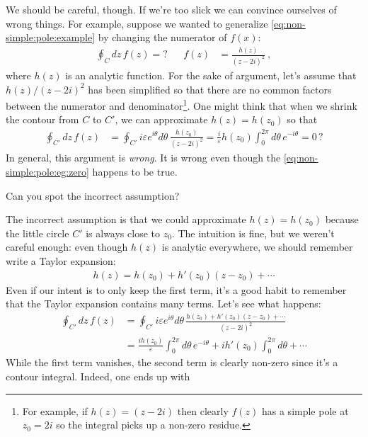 We should be careful, though. If we're too slick we can convince ourselves of wrong things. For example, suppose we wanted to generalize \eqref{eq:non-simple:pole:example} by changing the numerator of $f(x)$:
\begin{align}
  \oint_C dz \, f(z) = ?
  &&
  f(z) &= \frac{h(z)}{(z-2i)^2} \ ,
  \label{eq:non-simple:pole:example:hz}
\end{align}
where $h(z)$ is an analytic function. For the sake of argument, let's assume that $h(z)/(z-2i)^2$ has been simplified so that there are no common factors between the numerator and denominator\footnote{For example, if $h(z)=(z-2i)$ then clearly $f(z)$ has a simple pole at $z_0=2i$ so the integral picks up a non-zero residue.}. One might think that when we shrink the contour from $C$ to $C'$, we can approximate $h(z)= h(z_0)$ so that
\begin{align}
  \oint_{C'}dz\, f(z)
  &=
  \oint_{C'} i\varepsilon e^{i\theta}d\theta\, 
  \frac{h(z_0)}{\left(z-2i\right)^2}
  =
  \frac{i}{\varepsilon}h(z_0)
  \int_0^{2\pi} d\theta\, 
  e^{-i\theta}
  = 0\,?
\end{align}
In general, this argument is \emph{wrong}. It is wrong even though the \eqref{eq:non-simple:pole:eg:zero} happens to be true. 
\begin{exercise}
Can you spot the incorrect assumption?
\end{exercise}
The incorrect assumption is that we could approximate $h(z) = h(z_0)$ because the little circle $C'$ is always close to $z_0$. The intuition is fine, but we weren't careful enough: even though $h(z)$ is analytic everywhere, we should remember write a Taylor expansion:
\begin{align}
  h(z) = h(z_0) + h'(z_0)(z-z_0) + \cdots
\end{align}
Even if our intent is to only keep the first term, it's a good habit to remember that the Taylor expansion contains many terms. Let's see what happens: 
\begin{align}
  \oint_{C'}dz\, f(z)
  &=
  \oint_{C'} i\varepsilon e^{i\theta}d\theta\, 
  \frac{h(z_0)+ h'(z_0)(z-z_0) + \cdots}{\left(z-2i\right)^2}
  \\
  &
  =
  \frac{ih(z_0)}{\varepsilon}
  \int_0^{2\pi} d\theta\, 
  e^{-i\theta}
  +
  {ih'(z_0)}
  \int_0^{2\pi} d\theta
  +\cdots
  \label{eq:non-simple:pole:example:hz:punchline}
\end{align}
While the first term vanishes, the second term is clearly non-zero since it's a contour integral. Indeed, one ends up with
